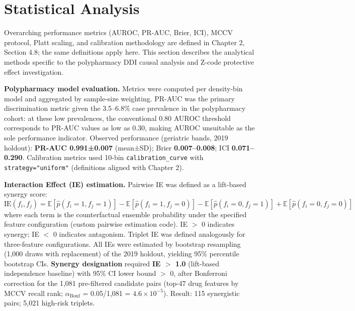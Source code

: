 \documentclass[
  12pt,
]{book}
\begin{document}
\section{Statistical Analysis}\label{statistical-analysis-2}

Overarching performance metrics (AUROC, PR-AUC, Brier, ICI), MCCV
protocol, Platt scaling, and calibration methodology are defined in
Chapter 2, Section 4.8; the same definitions apply here. This section
describes the analytical methods specific to the polypharmacy DDI causal
analysis and Z-code protective effect investigation.

\textbf{Polypharmacy model evaluation.} Metrics were computed per
density-bin model and aggregated by sample-size weighting. PR-AUC was
the primary discrimination metric given the 3.5--6.8\% case prevalence
in the polypharmacy cohort: at these low prevalences, the conventional
0.80 AUROC threshold corresponds to PR-AUC values as low as 0.30, making
AUROC unsuitable as the sole performance indicator. Observed performance
(geriatric bands, 2019 holdout): \textbf{PR-AUC 0.991±0.007} (mean±SD);
Brier \textbf{0.007--0.008}; ICI \textbf{0.071--0.290}. Calibration
metrics used 10-bin \texttt{calibration\_curve} with
\texttt{strategy="uniform"} (definitions aligned with Chapter 2).

\textbf{Interaction Effect (IE) estimation.} Pairwise IE was defined as
a lift-based synergy score:
\[\text{IE}(f_i, f_j) = \mathbb{E}[\hat{p}(f_i{=}1, f_j{=}1)]
  - \mathbb{E}[\hat{p}(f_i{=}1, f_j{=}0)]
  - \mathbb{E}[\hat{p}(f_i{=}0, f_j{=}1)]
  + \mathbb{E}[\hat{p}(f_i{=}0, f_j{=}0)]\] where each term is the
counterfactual ensemble probability under the specified feature
configuration (custom pairwise estimation code). IE \(>\) 0 indicates
synergy; IE \(<\) 0 indicates antagonism. Triplet IE was defined
analogously for three-feature configurations. All IEs were estimated by
bootstrap resampling (1,000 draws with replacement) of the 2019 holdout,
yielding 95\% percentile bootstrap CIs. \textbf{Synergy designation}
required \textbf{IE \(>\) 1.0} (lift-based independence baseline) with
95\% CI lower bound \(>\) 0, after Bonferroni correction for the 1,081
pre-filtered candidate pairs (top-47 drug features by MCCV recall rank;
\(\alpha_{\text{Bonf}}\) = 0.05/1,081 = \(4.6\times10^{-5}\)). Result:
115 synergistic pairs; 5,021 high-risk triplets.
\end{document}
